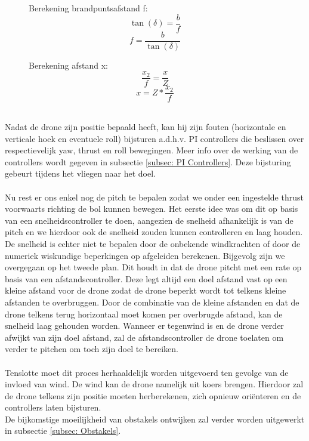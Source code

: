 \begin{figure}[h]
	\centering
	\begin{minipage}{.5\textwidth}
		Berekening brandpuntsafstand f:
		\begin{equation} \label{eq:RelatieveVerticaleHoekBegin}
		\tan(\delta) = \frac{b}{f}
		\end{equation}
		\begin{equation} 
		f = \frac{b}{\tan(\delta)}
		\end{equation}
	\end{minipage}
	\begin{minipage}{.45\textwidth}
		Berekening afstand x:
		\begin{equation} 
		\frac{x_2}{f} = \frac{x}{Z}
		\end{equation}
		\begin{equation} \label{eq:RelatieveVerticaleHoekEind}
		x = Z * \frac{x_2}{f}	
		\end{equation}
	\end{minipage}%
\end{figure}
\\
Nadat de drone zijn positie bepaald heeft, kan hij zijn fouten (horizontale en verticale hoek en eventuele roll) bijsturen a.d.h.v. PI controllers die beslissen over respectievelijk yaw, thrust en roll bewegingen. Meer info over de werking van de controllers wordt gegeven in subsectie \ref{subsec: PI Controllers}. Deze bijsturing gebeurt tijdens het vliegen naar het doel. 
\\
\\
Nu rest er ons enkel nog de pitch te bepalen zodat we onder een ingestelde thrust voorwaarts richting de bol kunnen bewegen. Het eerste idee was om dit op basis van een snelheidscontroller te doen, aangezien de snelheid afhankelijk is van de pitch en we hierdoor ook de snelheid zouden kunnen controlleren en laag houden. De snelheid is echter niet te bepalen door de onbekende windkrachten of door de numeriek wiskundige beperkingen op afgeleiden berekenen. Bijgevolg zijn we overgegaan op het tweede plan. Dit houdt in dat de drone pitcht met een rate op basis van een afstandscontroller. Deze legt altijd een doel afstand vast op een kleine afstand voor de drone zodat de drone beperkt wordt tot telkens kleine afstanden te overbruggen. Door de combinatie van de kleine afstanden en dat de drone telkens terug horizontaal moet komen per overbrugde afstand, kan de snelheid laag gehouden worden. Wanneer er tegenwind is en de drone verder afwijkt van zijn doel afstand, zal de afstandscontroller de drone toelaten om verder te pitchen om toch zijn doel te bereiken.
\\
\\
Tenslotte moet dit proces herhaaldelijk worden uitgevoerd ten gevolge van de invloed van wind. De wind kan de drone namelijk uit koers brengen. Hierdoor zal de drone telkens zijn positie moeten herberekenen, zich opnieuw ori\"enteren en de controllers laten bijsturen.
\\
De bijkomstige moeilijkheid van obstakels ontwijken zal verder worden uitgewerkt in subsectie \ref{subsec: Obstakels}.